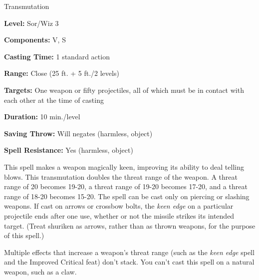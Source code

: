 
Transmutation

\textbf{Level:} Sor/Wiz 3

\textbf{Components:} V, S

\textbf{Casting Time:} 1 standard action

\textbf{Range:} Close (25 ft. + 5 ft./2 levels)

\textbf{Targets:} One weapon or fifty projectiles, all of which must be in contact 
with each other at the time of casting

\textbf{Duration:} 10 min./level

\textbf{Saving Throw:} Will negates (harmless, object)

\textbf{Spell Resistance:} Yes (harmless, object)

This spell makes a weapon magically keen, improving its ability to deal telling 
blows. This transmutation doubles the threat range of the weapon. A threat range 
of 20 becomes 19-20, a threat range of 19-20 becomes 17-20, and a threat range 
of 18-20 becomes 15-20. The spell can be cast only on piercing or slashing weapons. 
If cast on arrows or crossbow bolts, the \textit{keen edge} on a particular projectile 
ends after one use, whether or not the missile strikes its intended target. (Treat 
shuriken as arrows, rather than as thrown weapons, for the purpose of this spell.)

Multiple effects that increase a weapon's threat range (such as the \textit{keen 
edge} spell and the Improved Critical feat) don't stack. You can't cast this spell 
on a natural weapon, such as a claw.

